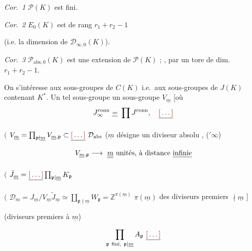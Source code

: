\documentclass[11pt,a4paper]{article}
\begin{document}
\ill{} \ill{} 

\emph{Cor.~1} \quad $\mathcal{P}(K)$ est fini.

\emph{Cor.~2} \quad $E_0(K)$ est de rang $r_1 + r_2 - 1$

(i.e. la dimension de $\mathcal{D}_{\infty,0}(K)$). \ill{}

\emph{Cor.~3} \quad $\mathcal{P}_{\mathrm{abs},0}(K)$ est une extension de
$\mathcal{P}(K)$ ; , par un tore de dim.\ $r_1 + r_2 - 1$.

On s'intéresse aux sous-groupes  de $C(K)$
\struck{\ill{} \ill{}} \struck{\ill{} \ill{}} i.e.\ aux sous-groupes
 de $J(K)$ contenant $K^{*}$. Un tel sous-groupe
 un sous-groupe  
\struck{\ill{}} $V_{\underline{m}}$ [où
\[
J_\infty^{\mathrm{conn}} \ \struck{=}\ \prod J^{\mathrm{conn}}, \quad \struck{\ill{}}
\]

$\bigl($ $V_{\underline{m}} = \prod_{\mathfrak{p} \nmid \underline{m}} V_{\underline{m},\mathfrak{p}} \subset \struck{\ill{}}\ \mathcal{D}_{\mathrm{abs}}$
\quad ($\underline{m}$ désigne un diviseur absolu ,
\ill{} \ill{}  \ill{} ($'\infty$)
\[
V_{\underline{m},\mathfrak{p}} \longrightarrow \ \struck{\underline{m}}\ \text{unités, à distance \uncertain{infinie}}
\]

$\bigl($ $\tilde J_{\underline{m}} = \struck{\ill{}} \prod_{\mathfrak{p} \mid \underline{m}} K_{\mathfrak{p}}$

$\bigl($ $\mathcal{D}_{\underline{m}} = J_{\underline{m}}/V_{\underline{m}}\tilde J_{\underline{m}} \simeq \coprod_{\mathfrak{p} \nmid \underline{m}} W_{\mathfrak{p}} = \mathbb{Z}^{\pi(\underline{m})}$
\quad $\pi(\underline{m})$  des diviseurs premiers $\nmid \underline{m}$ ]

(diviseurs premiers à $\underline{m}$)

\struck{\ill{} \ill{} \ill{}}
\[
\prod_{\mathfrak{p}\ \text{fini},\ \mathfrak{p} \mid \underline{m}} A_{\mathfrak{p}} \ \struck{\ill{}}
\]
\end{document}
